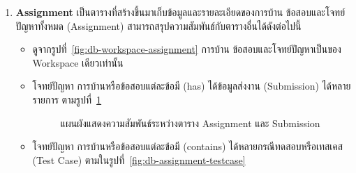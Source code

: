 \documentclass[12pt,one side,openright,a4paper]{cpe-thesis-th}
\begin{document}
\begin{enumerate}
\begin{itemize}
                \end{itemize}
        \item \textbf{Assignment}
            เป็นตารางที่สร้างขึ้นมาเก็บข้อมูลและรายละเอียดของการบ้าน ข้อสอบและโจทย์ปัญหาทั้งหมด (Assignment) สามารถสรุปความสัมพันธ์กับตารางอื่นได้ดังต่อไปนี้
                \begin{itemize}
                    \item ดูจากรูปที่~\ref{fig:db-workspace-assignment} การบ้าน ข้อสอบและโจทย์ปัญหาเป็นของ Workspace เดียวเท่านั้น
                    \item โจทย์ปัญหา การบ้านหรือข้อสอบแต่ละข้อมี (has) ได้ข้อมูลส่งงาน (Submission) ได้หลายรายการ ตามรูปที่~\ref{fig:db-assignment-submission}
                    \begin{figure}[H]
                        \centering 
                        \caption[แผนผังแสดงความสัมพันธ์ระหว่างตาราง Assignment และ Submission]{แผนผังแสดงความสัมพันธ์ระหว่างตาราง Assignment และ Submission}
                        \label{fig:db-assignment-submission}
                    \end{figure}
                    \item โจทย์ปัญหา การบ้านหรือข้อสอบแต่ละข้อมี (contains) ได้หลายกรณีทดสอบหรือเทสเคส (Test Case) ตามในรูปที่~\ref{fig:db-assignment-testcase}
                    \begin{figure}[H]
                        \centering 
\end{figure}
\end{itemize}
\end{enumerate}
\end{document}
